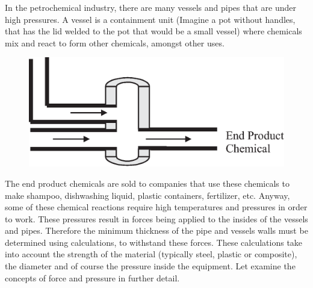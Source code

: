 In the petrochemical industry, there are many vessels and pipes that
are under high pressures. A vessel is a containment unit (Imagine a
pot without handles, that has the lid welded to the pot  that would
be a small vessel) where chemicals mix and react to form other
chemicals, amongst other uses.
\begin{figure}[H]
\centering
\includegraphics[scale=0.4]{../../epsimages/EssayPressure4.eps}
\end{figure}

The end product chemicals are sold to companies that use these
chemicals to make shampoo, dishwashing liquid, plastic containers,
fertilizer, etc. Anyway, some of these chemical reactions require
high temperatures and pressures in order to work. These pressures
result in forces being applied to the insides of the vessels and
pipes. Therefore the minimum thickness of the pipe and vessels walls
must be determined using calculations, to withstand these forces.
These calculations take into account the strength of the material
(typically steel, plastic or composite), the diameter and of course
the pressure inside the equipment. Let examine the concepts of
force and pressure in further detail.

